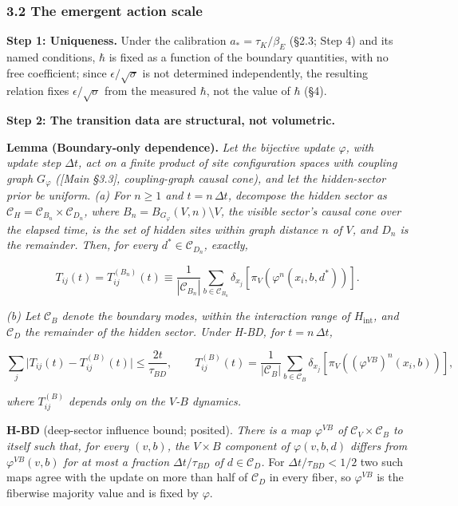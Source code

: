 \documentclass[
]{article}
\begin{document}
\hypertarget{the-emergent-action-scale}{%
\subsubsection{3.2 The emergent action
scale}\label{the-emergent-action-scale}}

\textbf{Step 1: Uniqueness.} Under the calibration
\(a_*=\tau_K/\beta_E\) (§2.3; Step 4) and its named conditions,
\(\hbar\) is fixed as a function of the boundary quantities, with no
free coefficient; since \(\epsilon/\sqrt{\sigma}\) is not determined
independently, the resulting relation fixes \(\epsilon/\sqrt{\sigma}\)
from the measured \(\hbar\), not the value of \(\hbar\) (§4).

\textbf{Step 2: The transition data are structural, not volumetric.}

\textbf{Lemma (Boundary-only dependence).} \emph{Let the bijective
update \(\varphi\), with update step \(\Delta t\), act on a finite
product of site configuration spaces with coupling graph \(G_\varphi\)
({[}Main §3.3{]}, coupling-graph causal cone), and let the hidden-sector
prior be uniform. (a) For \(n \geq 1\) and \(t = n\,\Delta t\),
decompose the hidden sector as
\(\mathcal{C}_H = \mathcal{C}_{B_n} \times \mathcal{C}_{D_n}\), where
\(B_n = B_{G_\varphi}(V, n) \setminus V\), the visible sector's causal
cone over the elapsed time, is the set of hidden sites within graph
distance \(n\) of \(V\), and \(D_n\) is the remainder. Then, for every
\(d^* \in \mathcal{C}_{D_n}\), exactly,}

\[T_{ij}(t) = T^{(B_n)}_{ij}(t) \equiv \frac{1}{|\mathcal{C}_{B_n}|} \sum_{b \in \mathcal{C}_{B_n}} \delta_{x_j}[\pi_V(\varphi^n(x_i, b, d^*))].\]

\emph{(b) Let \(\mathcal{C}_B\) denote the boundary modes, within the
interaction range of \(H_{\text{int}}\), and \(\mathcal{C}_D\) the
remainder of the hidden sector. Under H-BD, for \(t = n\,\Delta t\),}

\[\sum_j \big|T_{ij}(t) - T^{(B)}_{ij}(t)\big| \leq \frac{2t}{\tau_{BD}}, \qquad T^{(B)}_{ij}(t) = \frac{1}{|\mathcal{C}_B|} \sum_{b \in \mathcal{C}_B} \delta_{x_j}[\pi_V((\varphi^{VB})^n(x_i, b))],\]

\emph{where \(T^{(B)}_{ij}\) depends only on the \(V\)-\(B\) dynamics.}

\textbf{H-BD} (deep-sector influence bound; posited). \emph{There is a
map \(\varphi^{VB}\) of \(\mathcal{C}_V \times \mathcal{C}_B\) to itself
such that, for every \((v, b)\), the \(V \times B\) component of
\(\varphi(v, b, d)\) differs from \(\varphi^{VB}(v, b)\) for at most a
fraction \(\Delta t/\tau_{BD}\) of \(d \in \mathcal{C}_D\).} For
\(\Delta t/\tau_{BD} < 1/2\) two such maps agree with the update on more
than half of \(\mathcal{C}_D\) in every fiber, so \(\varphi^{VB}\) is
the fiberwise majority value and is fixed by \(\varphi\).
\end{document}
